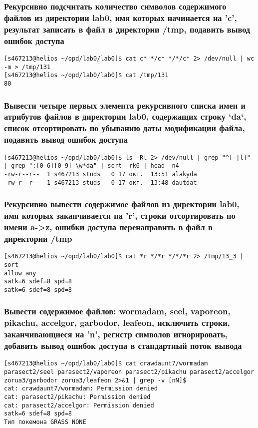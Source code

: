 \subsubsection*{Рекурсивно подсчитать количество символов содержимого файлов из директории lab0, имя которых начинается на 'c', результат записать в файл в директории /tmp, подавить вывод ошибок доступа}
\begin{verbatim}
[s467213@helios ~/opd/lab0/lab0]$ cat c* */c* */*/c* 2> /dev/null | wc -m > /tmp/131
[s467213@helios ~/opd/lab0/lab0]$ cat /tmp/131
80
\end{verbatim}


\subsubsection*{Вывести четыре первых элемента рекурсивного списка имен и атрибутов файлов в директории lab0, содержащих строку `da`, список отсортировать по убыванию даты модификации файла, подавить вывод ошибок доступа}
\begin{verbatim}
[s467213@helios ~/opd/lab0/lab0]$ ls -Rl 2> /dev/null | grep "^[-|l]" | grep ":[0-6][0-9] \w*da" | sort -rk6 | head -n4
-rw-r--r--  1 s467213 studs   0 17 окт.  13:51 alakyda
-rw-r--r--  1 s467213 studs   0 17 окт.  13:48 dautdat
\end{verbatim}

\subsubsection*{Рекурсивно вывести содержимое файлов из директории lab0, имя которых заканчивается на 'r', строки отсортировать по имени a->z, ошибки доступа перенаправить в файл в директории /tmp}
\begin{verbatim}
[s467213@helios ~/opd/lab0/lab0]$ cat *r */*r */*/*r 2> /tmp/13_3 | sort
allow any
satk=6 sdef=8 spd=8
satk=6 sdef=8 spd=8
\end{verbatim}

\subsubsection*{Вывести содержимое файлов: wormadam, seel, vaporeon, pikachu, accelgor, garbodor, leafeon, исключить строки, заканчивающиеся на 'n', регистр символов игнорировать, добавить вывод ошибок доступа в стандартный поток вывода}
\begin{verbatim}
[s467213@helios ~/opd/lab0/lab0]$ cat crawdaunt7/wormadam parasect2/seel parasect2/vaporeon parasect2/pikachu parasect2/accelgor zorua3/garbodor zorua3/leafeon 2>&1 | grep -v [nN]$
cat: crawdaunt7/wormadam: Permission denied
cat: parasect2/pikachu: Permission denied
cat: parasect2/accelgor: Permission denied
satk=6 sdef=8 spd=8
Тип покемона GRASS NONE
\end{verbatim}

